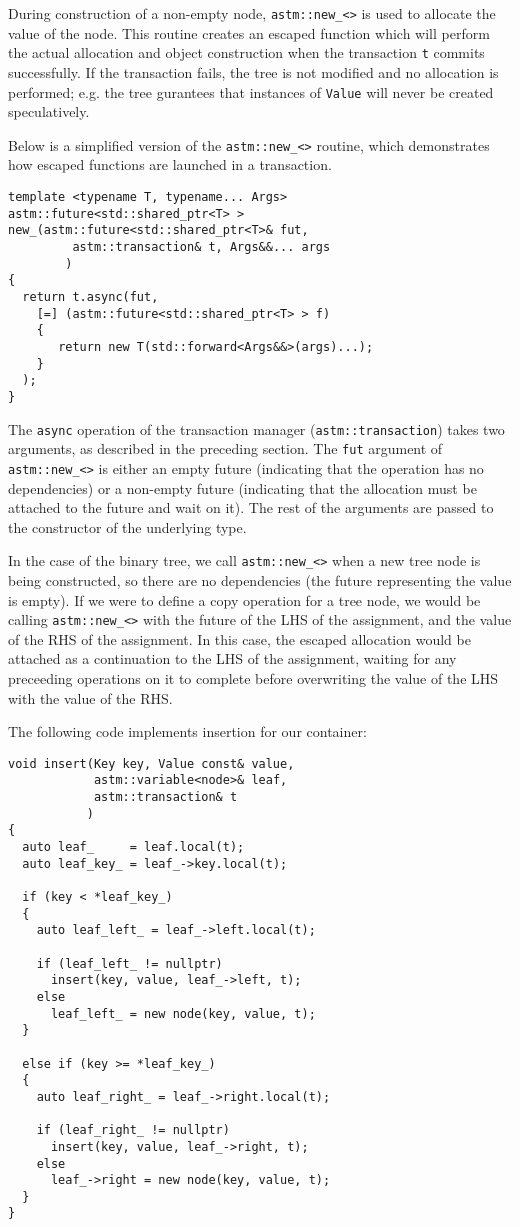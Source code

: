 \documentclass[conference]{IEEEtran}
\begin{document}
During construction of a non-empty node, \lstinline$astm::new_<>$ is used to allocate the value of the node. This routine creates an escaped function which will perform the actual allocation and object construction when the transaction \lstinline$t$ commits successfully. If the transaction fails, the tree is not modified and no allocation is performed; e.g. the tree gurantees that instances of \lstinline$Value$ will never be created speculatively.

Below is a simplified version of the \lstinline$astm::new_<>$ routine, which demonstrates how escaped functions are launched in a transaction.

\begin{lstlisting}
template <typename T, typename... Args>
astm::future<std::shared_ptr<T> >   
new_(astm::future<std::shared_ptr<T>& fut,
         astm::transaction& t, Args&&... args
        ) 
{
  return t.async(fut, 
    [=] (astm::future<std::shared_ptr<T> > f)
    {
       return new T(std::forward<Args&&>(args)...);
    }
  );
}
\end{lstlisting}

The \lstinline$async$ operation of the transaction manager (\lstinline$astm::transaction$) takes two arguments, as described in the preceding section. The \lstinline$fut$ argument of \lstinline$astm::new_<>$ is either an empty future (indicating that the operation has no dependencies) or a non-empty future (indicating that the allocation must be attached to the future and wait on it). The rest of the arguments are passed to the constructor of the underlying type.

In the case of the binary tree, we call \lstinline$astm::new_<>$ when a new tree node is being constructed, so there are no dependencies (the future representing the value is empty). If we were to define a copy operation for a tree node, we would be calling \lstinline$astm::new_<>$ with the future of the LHS of the assignment, and the value of the RHS of the assignment. In this case, the escaped allocation would be attached as a continuation to the LHS of the assignment, waiting for any preceeding operations on it to complete before overwriting the value of the LHS with the value of the RHS.

The following code implements insertion for our container:

\begin{lstlisting}
void insert(Key key, Value const& value,
            astm::variable<node>& leaf,
            astm::transaction& t
           )
{
  auto leaf_     = leaf.local(t);
  auto leaf_key_ = leaf_->key.local(t);

  if (key < *leaf_key_)
  {
    auto leaf_left_ = leaf_->left.local(t);

    if (leaf_left_ != nullptr)
      insert(key, value, leaf_->left, t);
    else
      leaf_left_ = new node(key, value, t); 
  }

  else if (key >= *leaf_key_)
  {
    auto leaf_right_ = leaf_->right.local(t);

    if (leaf_right_ != nullptr)
      insert(key, value, leaf_->right, t);
    else
      leaf_->right = new node(key, value, t);
  }
}
\end{lstlisting}
\end{document}

